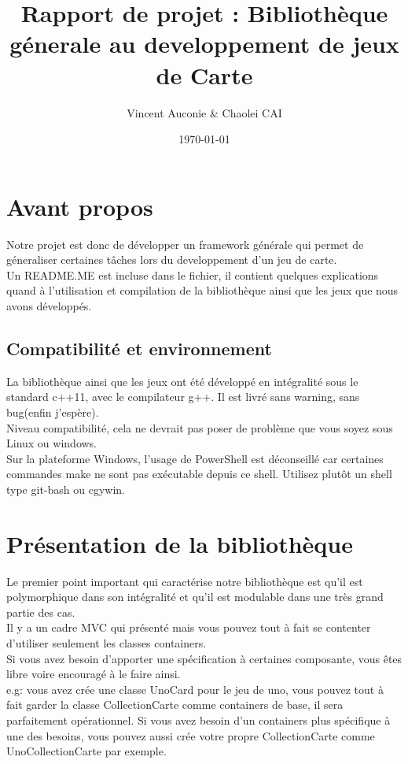 \documentclass[12pt, letterpaper]{article}
\title{Rapport de projet : Bibliothèque génerale au developpement de jeux de Carte}
\author{Vincent Auconie \& Chaolei CAI
\\ 
  \multicolumn{1}{
      p{.7\textwidth}}{\centering\emph{Université de Paris \\
  UFR Informatique\\}
  M1 Informatique}
}
\date{\today}
\begin{document}
\begin{titlepage}
    \maketitle
\end{titlepage}

\tableofcontents

\section{Avant propos}
Notre projet est donc de développer un framework générale qui permet de géneraliser certaines tâches lors 
du developpement d'un jeu de carte. \\
Un README.ME est incluse dans le fichier, il contient quelques explications quand à l'utilisation et compilation de la bibliothèque ainsi que les jeux que 
nous avons développés.\\

\subsection{Compatibilité et environnement}
La bibliothèque ainsi que les jeux ont été développé en intégralité sous le standard c++11, avec le compilateur g++.
Il est livré sans warning, sans bug(enfin j'espère).\\ 
Niveau compatibilité, cela ne devrait pas poser de problème que vous soyez sous Linux ou windows.\\
Sur la plateforme Windows, l'usage de PowerShell est déconseillé car certaines commandes make ne sont pas exécutable depuis ce shell. 
Utilisez plutôt un shell type git-bash ou cgywin.


\section{Présentation de la bibliothèque}
Le premier point important qui caractérise notre bibliothèque est qu'il est polymorphique dans son intégralité et qu'il est modulable dans une 
très grand partie des cas. \\
Il y a un cadre MVC qui présenté mais vous pouvez tout à fait se contenter d'utiliser seulement les classes containers.\\
Si vous avez besoin d'apporter une spécification à certaines composante, vous êtes libre voire encouragé à le faire ainsi.\\
e.g: vous avez crée une classe UnoCard pour le jeu de uno, vous pouvez tout à fait garder la classe CollectionCarte comme containers de base, 
il sera parfaitement opérationnel. Si vous avez besoin d'un containers plus spécifique à une des besoins, vous pouvez aussi crée votre propre CollectionCarte comme UnoCollectionCarte par exemple.
\end{document}
